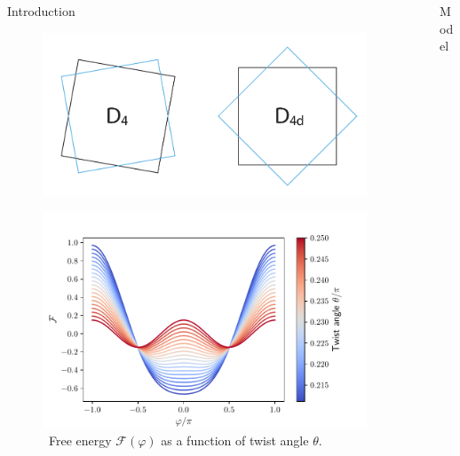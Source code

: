 \documentclass[final]{beamer}
\newlength{\sepwid}
\newlength{\onecolwid}
\begin{document}
\begin{frame}[t]
\begin{columns}[t]
\begin{column}{\onecolwid}
\begin{block}{Introduction}
\end{block}



\begin{figure}
	\includegraphics[width=0.78\linewidth]{fig/sketch.pdf}
\end{figure}

\begin{figure}
	\includegraphics[width=0.78\linewidth]{fig/cos.pdf}
	\caption{\sffamily \, Free energy $\mathcal{F}(\varphi)$ as a function of twist angle $\theta$.}
\label{fig:cos}
\end{figure}


\end{column} %


\begin{column}{\sepwid}\end{column} %

\begin{column}{\onecolwid} %
\rmfamily
\justify
\begin{block}{Model}



\end{block}
\end{column}
\end{columns}
\end{frame}
\end{document}
